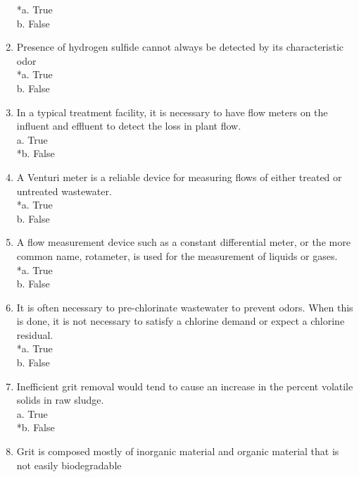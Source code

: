 \begin{enumerate}
*a. True \\
b. False 

\vspace{0.4cm}
\item  Presence of hydrogen sulfide cannot always be detected by its characteristic odor \\

*a. True \\
b. False 

\vspace{0.4cm}
\item  In a typical treatment facility, it is necessary to have flow meters on the influent and effluent to detect the loss in plant flow. \\

a. True \\
*b. False 

\vspace{0.4cm}
\item  A Venturi meter is a reliable device for measuring flows of either treated or untreated wastewater. \\

*a. True \\
b. False 

\vspace{0.4cm}
\item  A flow measurement device such as a constant differential meter, or the more common name, rotameter, is used for the measurement of liquids or gases. \\

*a. True \\
b. False 

\vspace{0.4cm}
\item  It is often necessary to pre-chlorinate wastewater to prevent odors. When this is done, it is not necessary to satisfy a chlorine demand or expect a chlorine residual. \\

*a. True \\
b. False 

\vspace{0.4cm}
\item  Inefficient grit removal would tend to cause an increase in the percent volatile solids in raw sludge. \\

a. True \\
*b. False 

\vspace{0.4cm}
\item  Grit is composed mostly of inorganic material and organic material that is not easily biodegradable \\


\end{enumerate}
